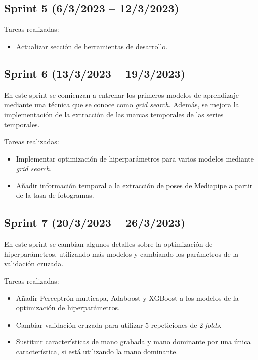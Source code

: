 \subsection{Sprint 5 (6/3/2023 -- 12/3/2023)}

Tareas realizadas:

\begin{itemize}
    \item Actualizar sección de herramientas de desarrollo.
\end{itemize}

\subsection{Sprint 6 (13/3/2023 -- 19/3/2023)}

En este sprint se comienzan a entrenar los primeros modelos de aprendizaje
mediante una técnica que se conoce como \textit{grid search}. Además, se mejora
la implementación de la extracción de las marcas temporales de las series
temporales.

Tareas realizadas:

\begin{itemize}
    \item Implementar optimización de hiperparámetros para varios modelos
          mediante \textit{grid search}.
    \item Añadir información temporal a la extracción de poses de Mediapipe a
          partir de la tasa de fotogramas.
\end{itemize}

\subsection{Sprint 7 (20/3/2023 -- 26/3/2023)}

En este sprint se cambian algunos detalles sobre la optimización de
hiperparámetros, utilizando más modelos y cambiando los parámetros de la
validación cruzada.

Tareas realizadas:

\begin{itemize}
    \item Añadir Perceptrón multicapa, Adaboost y XGBoost a los modelos de la
          optimización de hiperparámetros.
    \item Cambiar validación cruzada para utilizar 5 repeticiones de 2
          \textit{folds}.
    \item Sustituir características de mano grabada y mano dominante por una
          única característica, si está utilizando la mano dominante.
\end{itemize}

